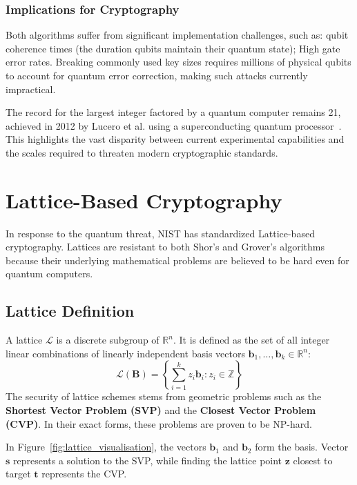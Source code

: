 \subsubsection{Implications for Cryptography}

Both algorithms suffer from significant implementation challenges, such as: qubit coherence times (the duration qubits maintain their quantum state); High gate error rates.
Breaking commonly used key sizes requires millions of physical qubits to account for quantum error correction, making such attacks currently impractical.

The record for the largest integer factored by a quantum computer remains 21, achieved in 2012 by \textlatin{Lucero et al.} using a superconducting quantum processor~\cite{Lucero2012-pp}.
This highlights the vast disparity between current experimental capabilities and the scales required to threaten modern cryptographic standards.

\section{Lattice-Based Cryptography}
\label{sec:lattice_based_cryptography}

In response to the quantum threat, NIST has standardized Lattice-based cryptography.
Lattices are resistant to both Shor's and Grover's algorithms because their underlying mathematical problems are believed to be hard even for quantum computers.

\subsection{Lattice Definition}
\label{subsec:lattice-definition}
A lattice $\mathcal{L}$ is a discrete subgroup of $\mathbb{R}^n$.
It is defined as the set of all integer linear combinations of linearly independent basis vectors $\mathbf{b}_1, \dots, \mathbf{b}_k \in \mathbb{R}^n$:
\begin{equation}
    \mathcal{L}(\mathbf{B}) = \left\{ \sum_{i=1}^k z_i \mathbf{b}_i : z_i \in \mathbb{Z} \right\}
\end{equation}
The security of lattice schemes stems from geometric problems such as the \textbf{Shortest Vector Problem (SVP)} and the \textbf{Closest Vector Problem (CVP)}.
In their exact forms, these problems are proven to be NP-hard.

In Figure~\ref{fig:lattice_visualisation}, the vectors $\mathbf{b}_1$ and $\mathbf{b}_2$ form the basis.
Vector $\mathbf{s}$ represents a solution to the SVP, while finding the lattice point $\mathbf{z}$ closest to target $\mathbf{t}$ represents the CVP\@.

